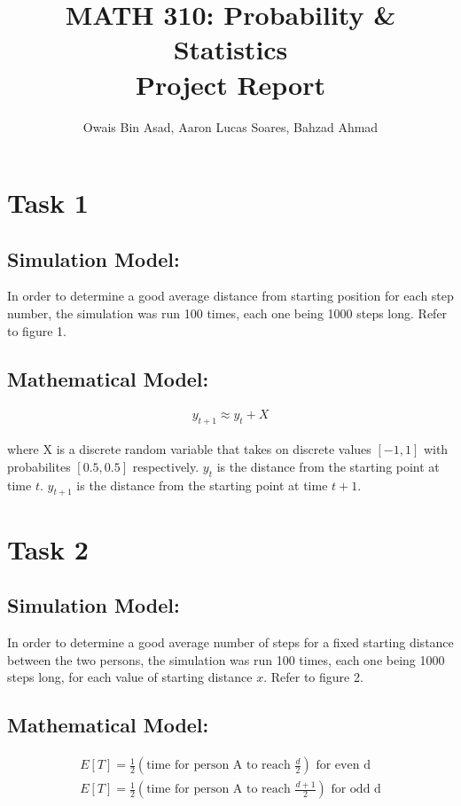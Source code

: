\documentclass[8pt]{extarticle}
\begin{document}
    
\title{MATH 310: Probability \& Statistics \\Project Report}
\author{Owais Bin Asad, Aaron Lucas Soares, Bahzad Ahmad}

\maketitle

\section*{Task 1}
\subsection*{Simulation Model:}
In order to determine a good average distance from starting position for each step number, the simulation was run
100 times, each one being 1000 steps long. Refer to figure 1.

\subsection*{Mathematical Model:}
\begin{align*}
    y_{t+1} \approx y_{t} + X
\end{align*}

where X is a discrete random variable that takes on discrete values $[-1, 1]$ with probabilites $[0.5, 0.5]$ respectively.
$y_t$ is the distance from the starting point at time $t$. $y_{t+1}$ is the distance from the starting point at time $t+1$.


\section*{Task 2}
\subsection*{Simulation Model:}
In order to determine a good average number of steps for a fixed starting distance between the two persons, the simulation was run
100 times, each one being 1000 steps long, for each value of starting distance $x$. Refer to figure 2.

\subsection*{Mathematical Model:}
\begin{align*}
    E[T] = \frac{1}{2}(\text{time for person A to reach }\frac{d}{2})\text{ for even d}\\
    E[T] = \frac{1}{2}(\text{time for person A to reach }\frac{d+1}{2})\text{ for odd d}\\
\end{align*}
\end{document}
